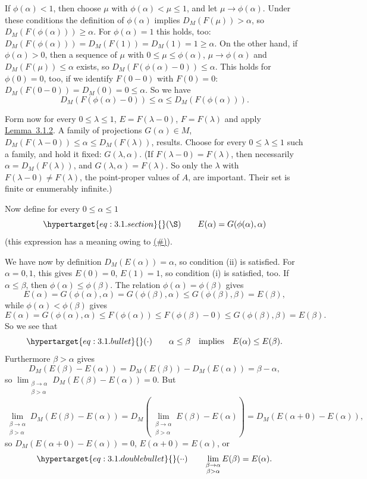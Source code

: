 \documentclass[twoside,leqno]{article}
\newcommand{\DM}{D_{M}}
\newcommand{\StatementRef}[2]{\hyperlink{stmt:#1}{#2}}
\newcommand{\EquationTarget}[1]{\hypertarget{eq:#1}{}}
\newcommand{\EquationRef}[2]{\hyperlink{eq:#1}{#2}}
\begin{document}
If $\phi(\alpha)<1$, then choose $\mu$ with $\phi(\alpha)<\mu\leq1$, and let
$\mu\to\phi(\alpha)$. Under these conditions the definition of $\phi(\alpha)$
implies $\DM(F(\mu))>\alpha$, so $\DM(F(\phi(\alpha)))\geq\alpha$. For $\phi(\alpha)=1$
this holds, too: $\DM(F(\phi(\alpha)))=\DM(F(1))=\DM(1)=1\geq\alpha$. On the other hand,
if $\phi(\alpha)>0$, then a sequence of $\mu$ with $0\leq\mu\leq\phi(\alpha)$,
$\mu\to\phi(\alpha)$ and $\DM(F(\mu))\leq\alpha$ exists, so
$\DM(F(\phi(\alpha)-0))\leq\alpha$.
This holds for $\phi(0)=0$, too, if we identify
$F(0-0)$ with $F(0)=0$: $\DM(F(0-0))=\DM(0)=0\leq\alpha$. So we have
\EquationTarget{hash}
\begin{equation*}
 \DM(F(\phi(\alpha)-0))\leq\alpha\leq\DM(F(\phi(\alpha))). \tag{$\#$}
\end{equation*}



Form now for every $0\leq\lambda\leq1$, $E=F(\lambda-0)$,
$F=F(\lambda)$ and apply \StatementRef{lemma:3.1.2}{Lemma~3.1.2}.
A family of projections $G(\alpha)\in M$,
$D_M(F(\lambda-0))\leq\alpha\leq D_M(F(\lambda))$, results. Choose for
every $0\leq\lambda\leq1$ such a family, and hold it
fixed: $G(\lambda,\alpha)$. (If $F(\lambda-0)=F(\lambda)$, then necessarily
$\alpha=D_M(F(\lambda))$, and $G(\lambda,\alpha)=F(\lambda)$. So only the
$\lambda$ with $F(\lambda-0)\ne F(\lambda)$, the point-proper values of $A$,
are important. Their set is finite or enumerably infinite.)

Now define for every $0\leq\alpha\leq1$
\[
 \EquationTarget{3.1.section}(\S)\qquad
 E(\alpha)=G(\phi(\alpha),\alpha)
\]
(this expression has a meaning owing to \EquationRef{hash}{(\#)}).

We have now by definition $D_M(E(\alpha))=\alpha$, so condition (ii) is
satisfied. For $\alpha=0,1$, this gives $E(0)=0$, $E(1)=1$, so condition (i)
is satisfied, too. If $\alpha\leq\beta$, then
$\phi(\alpha)\leq\phi(\beta)$. The relation
$\phi(\alpha)=\phi(\beta)$ gives
\[
 E(\alpha)=G(\phi(\alpha),\alpha)
 =G(\phi(\beta),\alpha)
 \leq G(\phi(\beta),\beta)=E(\beta),
\]
while $\phi(\alpha)<\phi(\beta)$ gives
\[
 E(\alpha)=G(\phi(\alpha),\alpha)
 \leq F(\phi(\alpha))
 \leq F(\phi(\beta)-0)
 \leq G(\phi(\beta),\beta)=E(\beta).
\]
So we see that
\[
 \EquationTarget{3.1.bullet}(\mathord{\cdot})\qquad
 \alpha\leq\beta\quad\hbox{implies}\quad E(\alpha)\leq E(\beta).
\]
Furthermore $\beta>\alpha$ gives
\[
 D_M(E(\beta)-E(\alpha))
 =D_M(E(\beta))-D_M(E(\alpha))=\beta-\alpha,
\]
so
$\lim_{\substack{\beta\to\alpha\\\beta>\alpha}}
D_M(E(\beta)-E(\alpha))=0$. But
\[
 \lim_{\substack{\beta\to\alpha\\\beta>\alpha}}
 D_M(E(\beta)-E(\alpha))
 =D_M\left(\lim_{\substack{\beta\to\alpha\\\beta>\alpha}}E(\beta)
 -E(\alpha)\right)
 =D_M(E(\alpha+0)-E(\alpha)),
\]
so $D_M(E(\alpha+0)-E(\alpha))=0$, $E(\alpha+0)=E(\alpha)$, or
\[
 \EquationTarget{3.1.doublebullet}(\mathord{\cdot}\mathord{\cdot})\qquad
 \lim_{\substack{\beta\to\alpha\\\beta>\alpha}}E(\beta)=E(\alpha).
\]
\end{document}
